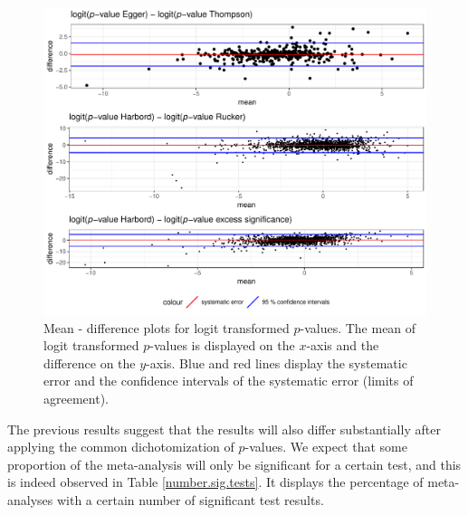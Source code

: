 \documentclass[11pt,a4paper,twoside]{book}\usepackage[]{graphicx}\usepackage[]{color}
\newenvironment{knitrout}{}{} %
\begin{document}
\begin{figure}
\begin{knitrout}
\color{fgcolor}

{\centering \includegraphics[width=\textwidth-3cm]{figure/ch03_figunnamed-chunk-12-1} 

}



\end{knitrout}
\caption{Mean - difference plots for logit transformed $p$-values. The mean of logit transformed $p$-values is displayed on the $x$-axis and the difference on the $y$-axis. Blue and red lines display the systematic error and the confidence intervals of the systematic error (limits of agreement).}
\label{fig:mean.diff.test}
\end{figure}

The previous results suggest that the results will also differ substantially after applying the common dichotomization of $p$-values. We expect that some proportion of the meta-analysis will only be significant for a certain test, and this is indeed observed in Table \ref{number.sig.tests}. It displays the percentage of meta-analyses with a certain number of significant test results.
\end{document}
